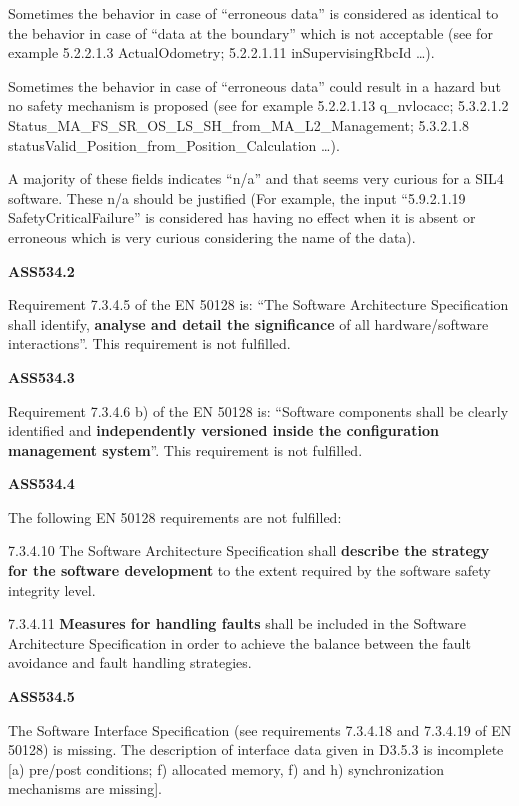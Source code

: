{\textbullet} Sometimes the behavior in case of ``erroneous data'' is considered as identical to the behavior in case of
``data at the boundary'' which is not acceptable (see for example 5.2.2.1.3 ActualOdometry; 5.2.2.1.11
inSupervisingRbcId {\dots}).

{\textbullet} Sometimes the behavior in case of ``erroneous data'' could result in a hazard but no safety mechanism is
proposed (see for example 5.2.2.1.13 q\_nvlocacc; 5.3.2.1.2 Status\_MA\_FS\_SR\_OS\_LS\_SH\_from\_MA\_L2\_Management;
5.3.2.1.8 statusValid\_Position\_from\_Position\_Calculation {\dots}).

{\textbullet} A majority of these fields indicates ``n/a'' and that seems very curious for a SIL4 software. These n/a
should be justified (For example, the input ``5.9.2.1.19 SafetyCriticalFailure'' is considered has having no effect
when it is absent or erroneous which is very curious considering the name of the data).


\bigskip

{\bfseries
ASS534.2}

Requirement 7.3.4.5 of the EN 50128 is: ``The Software Architecture Specification shall identify, \textbf{analyse and
detail the significance} of all hardware/software interactions''. This requirement is not fulfilled.


\bigskip

{\bfseries
ASS534.3}

Requirement 7.3.4.6 b) of the EN 50128 is: ``Software components shall be clearly identified and \textbf{independently
versioned inside the configuration management system}{}''. This requirement is not fulfilled.


\bigskip

{\bfseries
ASS534.4}

The following EN 50128 requirements are not fulfilled:

{\textbullet} 7.3.4.10 The Software Architecture Specification shall \textbf{describe the strategy for the software
development} to the extent required by the software safety integrity level. 

{\textbullet} 7.3.4.11 \textbf{Measures for handling faults} shall be included in the Software Architecture
Specification in order to achieve the balance between the fault avoidance and fault handling strategies.


\bigskip

{\bfseries
ASS534.5}

The Software Interface Specification (see requirements 7.3.4.18 and 7.3.4.19 of EN 50128) is missing. The description of
interface data given in D3.5.3 is incomplete [a) pre/post conditions; f) allocated memory, f) and h) synchronization
mechanisms are missing].



